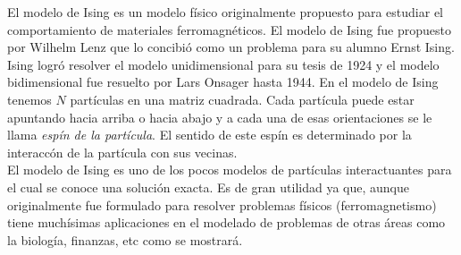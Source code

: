 \documentclass[portrait, a0b,final]{a0poster}%
\numberwithin{equation}{section}
\newenvironment{poster}{
  \begin{center}
  \begin{minipage}[c]{0.98\textwidth}
}{
  \end{minipage}
  \end{center}
}
\newenvironment{pcolumn}[1]{
  \begin{minipage}{#1\textwidth}
  \begin{center}
}{
  \end{center}
  \end{minipage}
}
\newcommand{\pbox}[4]{
\psshadowbox[#3]{
\begin{minipage}[t][#2][t]{#1}
#4
\end{minipage}
}}
\begin{document}
\begin{poster}
\begin{center}
\begin{pcolumn}{0.32}
{    El modelo de Ising es un modelo f\'isico originalmente propuesto para estudiar el comportamiento de materiales ferromagn\'eticos.
    El modelo de Ising fue propuesto por Wilhelm Lenz que lo concibi\'o como un problema para su alumno Ernst Ising. Ising logr\'o resolver el modelo unidimensional para su tesis de 1924 y el modelo bidimensional fue resuelto por Lars Onsager hasta 1944. En el modelo de Ising tenemos $N$ part\'iculas en una matriz cuadrada. Cada part\'icula puede estar apuntando hacia arriba o hacia abajo y a cada una de esas orientaciones se le llama \textit{esp\'in de la part\'icula}. El sentido de este esp\'in es determinado por la interacc\'on de la part\'icula con sus vecinas. \\

    El modelo de Ising es uno de los pocos modelos de part\'iculas interactuantes para el cual se conoce una soluci\'on exacta. Es de gran utilidad ya que, aunque originalmente fue formulado para resolver problemas f\'isicos (ferromagnetismo) tiene much\'isimas aplicaciones en el modelado de problemas de otras \'areas como la biolog\'ia, finanzas, etc como se mostrar\'a.\\

  

    \vspace{2cm}
    \begin{center}
        \pbox{0.8\textwidth}{}%
        {linewidth=2mm,framearc=0.1,linecolor=lightblue,fillstyle=gradient,gradangle=0,%
        gradbegin=white,gradend=whiteblue,gradmidpoint=1.0,framesep=1em}{%
        \begin{center}
            Modelo de Ising
        \end{center}}
    \end{center}
    \vspace{1.25cm}
    \setcounter{section}{3}%
\setcounter{equation}{0}%

}
\end{pcolumn}
\end{center}
\end{poster}
\end{document}
